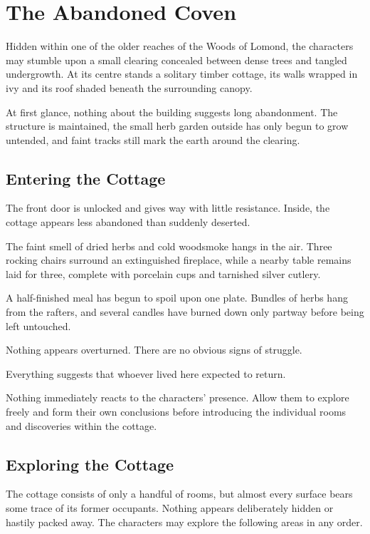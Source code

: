 \section*{The Abandoned Coven}
{\entryfont Hidden within one of the older reaches of the Woods of Lomond, the characters may stumble upon a small clearing concealed between dense trees and tangled undergrowth. At its centre stands a solitary timber cottage, its walls wrapped in ivy and its roof shaded beneath the surrounding canopy.

At first glance, nothing about the building suggests long abandonment. The structure is maintained, the small herb garden outside has only begun to grow untended, and faint tracks still mark the earth around the clearing.}

\subsection*{Entering the Cottage}
{\entryfont The front door is unlocked and gives way with little resistance. Inside, the cottage appears less abandoned than suddenly deserted.}
\begin{DndReadAloud}
	The faint smell of dried herbs and cold woodsmoke hangs in the air. Three rocking chairs surround an extinguished fireplace, while a nearby table remains laid for three, complete with porcelain cups and tarnished silver cutlery.

	A half-finished meal has begun to spoil upon one plate. Bundles of herbs hang from the rafters, and several candles have burned down only partway before being left untouched.

	Nothing appears overturned. There are no obvious signs of struggle.

	Everything suggests that whoever lived here expected to return.
\end{DndReadAloud}
{\noindent\entryfont Nothing immediately reacts to the characters' presence. Allow them to explore freely and form their own conclusions before introducing the individual rooms and discoveries within the cottage.}

\subsection*{Exploring the Cottage}
{\entryfont The cottage consists of only a handful of rooms, but almost every surface bears some trace of its former occupants. Nothing appears deliberately hidden or hastily packed away. The characters may explore the following areas in any order.}
